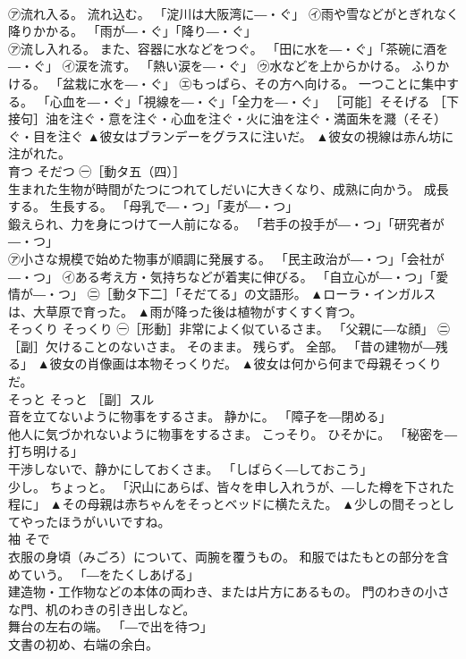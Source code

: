 \documentclass[8pt]{extreport}
\begin{document}
\begin{CJK}{UTF8}{min}
\\	㋐流れ入る。 流れ込む。 「淀川は大阪湾に―・ぐ」 ㋑雨や雪などがとぎれなく降りかかる。 「雨が―・ぐ」「降り―・ぐ」 
\\	㋐流し入れる。 また、容器に水などをつぐ。 「田に水を―・ぐ」「茶碗に酒を―・ぐ」 ㋑涙を流す。 「熱い涙を―・ぐ」 ㋒水などを上からかける。 ふりかける。 「盆栽に水を―・ぐ」 ㋓もっぱら、その方へ向ける。 一つことに集中する。 「心血を―・ぐ」「視線を―・ぐ」「全力を―・ぐ」 ［可能］そそげる ［下接句］油を注ぐ・意を注ぐ・心血を注ぐ・火に油を注ぐ・満面朱を濺（そそ）ぐ・目を注ぐ	▲彼女はブランデーをグラスに注いだ。 ▲彼女の視線は赤ん坊に注がれた。
\\	育つ	そだつ	㊀［動タ五（四）］ 
\\	生まれた生物が時間がたつにつれてしだいに大きくなり、成熟に向かう。 成長する。 生長する。 「母乳で―・つ」「麦が―・つ」 
\\	鍛えられ、力を身につけて一人前になる。 「若手の投手が―・つ」「研究者が―・つ」 
\\	㋐小さな規模で始めた物事が順調に発展する。 「民主政治が―・つ」「会社が―・つ」 ㋑ある考え方・気持ちなどが着実に伸びる。 「自立心が―・つ」「愛情が―・つ」 ㊁［動タ下二］「そだてる」の文語形。	▲ローラ・インガルスは、大草原で育った。 ▲雨が降った後は植物がすくすく育つ。
\\	そっくり	そっくり	㊀［形動］非常によく似ているさま。 「父親に―な顔」 ㊁［副］欠けることのないさま。 そのまま。 残らず。 全部。 「昔の建物が―残る」	▲彼女の肖像画は本物そっくりだ。 ▲彼女は何から何まで母親そっくりだ。
\\	そっと	そっと	［副］スル 
\\	音を立てないように物事をするさま。 静かに。 「障子を―閉める」 
\\	他人に気づかれないように物事をするさま。 こっそり。 ひそかに。 「秘密を―打ち明ける」 
\\	干渉しないで、静かにしておくさま。 「しばらく―しておこう」 
\\	少し。 ちょっと。 「沢山にあらば、皆々を申し入れうが、―した樽を下された程に」	▲その母親は赤ちゃんをそっとベッドに横たえた。 ▲少しの間そっとしてやったほうがいいですね。
\\	袖	そで	
\\	衣服の身頃（みごろ）について、両腕を覆うもの。 和服ではたもとの部分を含めていう。 「―をたくしあげる」 
\\	建造物・工作物などの本体の両わき、または片方にあるもの。 門のわきの小さな門、机のわきの引き出しなど。 
\\	舞台の左右の端。 「―で出を待つ」 
\\	文書の初め、右端の余白。 

\end{CJK}
\end{document}
